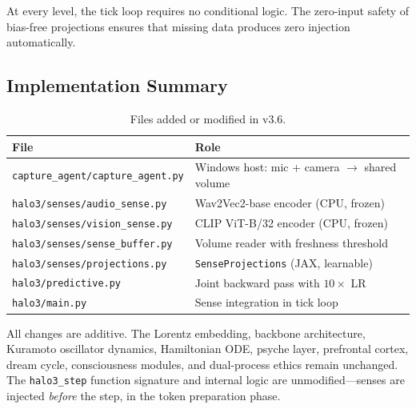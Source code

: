 At every level, the tick loop requires no conditional logic.
The zero-input safety of bias-free projections ensures that missing data produces zero injection automatically.

\subsection{Implementation Summary}

\begin{table}[h]
\centering
\caption{Files added or modified in v3.6.}
\label{tab:sense_files}
\small
\begin{tabularx}{\columnwidth}{lX}
\toprule
\textbf{File} & \textbf{Role} \\
\midrule
\texttt{capture\_agent/capture\_agent.py} & Windows host: mic + camera $\to$ shared volume \\
\texttt{halo3/senses/audio\_sense.py} & Wav2Vec2-base encoder (CPU, frozen) \\
\texttt{halo3/senses/vision\_sense.py} & CLIP ViT-B/32 encoder (CPU, frozen) \\
\texttt{halo3/senses/sense\_buffer.py} & Volume reader with freshness threshold \\
\texttt{halo3/senses/projections.py} & \texttt{SenseProjections} (JAX, learnable) \\
\texttt{halo3/predictive.py} & Joint backward pass with $10\times$ LR \\
\texttt{halo3/main.py} & Sense integration in tick loop \\
\bottomrule
\end{tabularx}
\end{table}

All changes are additive.
The Lorentz embedding, backbone architecture, Kuramoto oscillator dynamics, Hamiltonian ODE, psyche layer, prefrontal cortex, dream cycle, consciousness modules, and dual-process ethics remain unchanged.
The \texttt{halo3\_step} function signature and internal logic are unmodified---senses are injected \emph{before} the step, in the token preparation phase.
